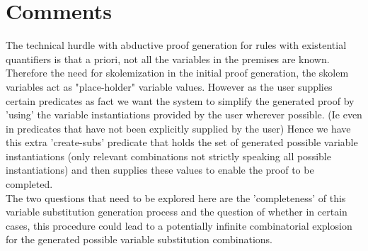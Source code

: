 \documentclass{article}
\begin{document}
\section{Comments}
The technical hurdle with abductive proof generation for rules with existential quantifiers is that a priori, not all the variables in the premises are known. Therefore the need for skolemization in the initial proof generation, the skolem variables act as "place-holder" variable values. However as the user supplies certain predicates as fact we want the system to simplify the generated proof by 'using' the variable instantiations provided by the user wherever possible. (Ie even in predicates that have not been explicitly supplied by the user) Hence we have this extra 'create-subs' predicate that holds the set of generated possible variable instantiations (only relevant combinations not strictly speaking all possible instantiations) and then supplies these values to enable the proof to be completed.\\
\newline
The two questions that need to be explored here are the 'completeness' of this variable substitution generation process and the question of whether in certain cases, this procedure could lead to a potentially infinite combinatorial explosion for the generated possible variable substitution combinations.
\end{document}
